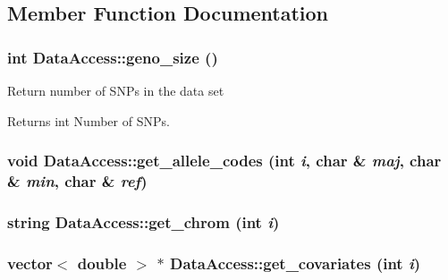 \subsection{Member Function Documentation}
\hypertarget{classDataAccess_a50b8be12574c5c4f454a0bbde76e0ea2}{
\subsubsection[{geno\_\-size}]{\setlength{\rightskip}{0pt plus 5cm}int DataAccess::geno\_\-size ()}}
\label{classDataAccess_a50b8be12574c5c4f454a0bbde76e0ea2}
Return number of SNPs in the data set

\begin{DoxyReturn}{Returns}
int Number of SNPs. 
\end{DoxyReturn}
\hypertarget{classDataAccess_a7476ba5cf613f7172cc1386895c637b8}{
\subsubsection[{get\_\-allele\_\-codes}]{\setlength{\rightskip}{0pt plus 5cm}void DataAccess::get\_\-allele\_\-codes (int {\em i}, \/  char \& {\em maj}, \/  char \& {\em min}, \/  char \& {\em ref})}}
\label{classDataAccess_a7476ba5cf613f7172cc1386895c637b8}
\hypertarget{classDataAccess_a323b6639c751a4512cc83577715b0e80}{
\subsubsection[{get\_\-chrom}]{\setlength{\rightskip}{0pt plus 5cm}string DataAccess::get\_\-chrom (int {\em i})}}
\label{classDataAccess_a323b6639c751a4512cc83577715b0e80}
\hypertarget{classDataAccess_aa4ffa6d4d9cf70fb34a3ab1d8227e895}{
\subsubsection[{get\_\-covariates}]{\setlength{\rightskip}{0pt plus 5cm}vector$<$ double $>$ $\ast$ DataAccess::get\_\-covariates (int {\em i})}}
